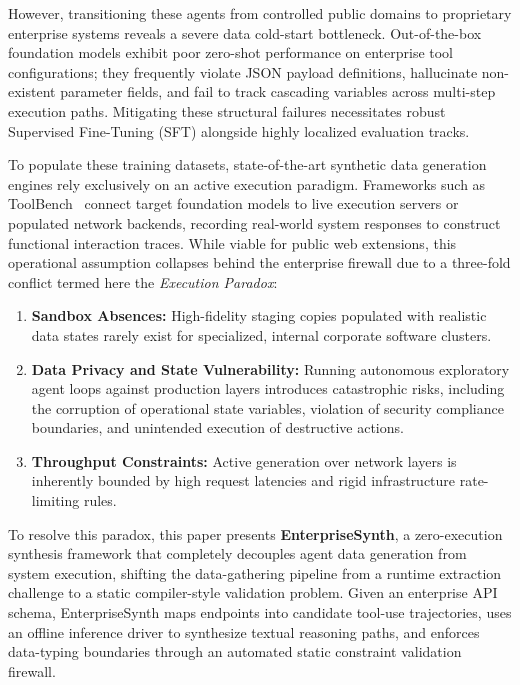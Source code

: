\documentclass[11pt]{article}
\begin{document}
However, transitioning these agents from controlled public domains to proprietary enterprise
systems reveals a severe data cold-start bottleneck. Out-of-the-box foundation models exhibit poor
zero-shot performance on enterprise tool configurations; they frequently violate JSON payload
definitions, hallucinate non-existent parameter fields, and fail to track cascading variables
across multi-step execution paths. Mitigating these structural failures necessitates robust
Supervised Fine-Tuning (SFT) alongside highly localized evaluation tracks.

To populate these training datasets, state-of-the-art synthetic data generation engines rely
exclusively on an active execution paradigm. Frameworks such as ToolBench~\cite{qin2023toolbench}
connect target foundation models to live execution servers or populated network backends,
recording real-world system responses to construct functional interaction traces. While viable
for public web extensions, this operational assumption collapses behind the enterprise firewall
due to a three-fold conflict termed here the \textit{Execution Paradox}:
\begin{enumerate}
    \item \textbf{Sandbox Absences:} High-fidelity staging copies populated with realistic data
    states rarely exist for specialized, internal corporate software clusters.
    \item \textbf{Data Privacy and State Vulnerability:} Running autonomous exploratory agent loops
    against production layers introduces catastrophic risks, including the corruption of
    operational state variables, violation of security compliance boundaries, and unintended
    execution of destructive actions.
    \item \textbf{Throughput Constraints:} Active generation over network layers is inherently
    bounded by high request latencies and rigid infrastructure rate-limiting rules.
\end{enumerate}

To resolve this paradox, this paper presents \textbf{EnterpriseSynth}, a zero-execution synthesis
framework that completely decouples agent data generation from system execution, shifting the
data-gathering pipeline from a runtime extraction challenge to a static compiler-style validation
problem. Given an enterprise API schema, EnterpriseSynth maps endpoints into candidate tool-use
trajectories, uses an offline inference driver to synthesize textual reasoning paths, and enforces
data-typing boundaries through an automated static constraint validation firewall.
\end{document}
